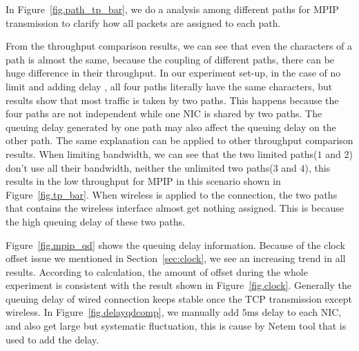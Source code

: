 In Figure~\ref{fig.path_tp_bar}, we do a analysis among different paths for MPIP transmission to clarify how all packets are assigned to each path. 

From the throughput comparison results, we can see that even the characters of a path is almost the same, because the coupling of different paths, there can be huge difference in their throughput. In our experiment set-up, in the case of no limit and adding delay , all four paths literally have the same characters, but results show that most traffic is taken by two paths. This happens because the four paths are not independent while one NIC is shared by two paths. The queuing delay generated by one path may also affect the queuing delay on the other path. The same explanation can be applied to other throughput comparison results. When limiting bandwidth, we can see that the two limited paths($1$ and $2$) don't use all their bandwidth, neither the unlimited two paths($3$ and $4$), this results in the low throughput for MPIP in this scenario shown in Figure~\ref{fig.tp_bar}. When wireless is applied to the connection, the two paths that contains the wireless interface almost get nothing assigned. This is because the high queuing delay of these two paths.

Figure~\ref{fig.mpip_qd} shows the queuing delay information. Because of the clock offset issue we mentioned in Section~\ref{sec:clock}, we see an increasing trend in all results. According to calculation, the amount of offset during the whole experiment is consistent with the result shown in Figure~\ref{fig.clock}. Generally the queuing delay of wired connection keeps stable once the TCP transmission except wireless. In Figure~\ref{fig.delayqdcomp}, we manually add $5$ms delay to each NIC, and also get large but systematic fluctuation, this is cause by Netem tool that is used to add the delay. 


